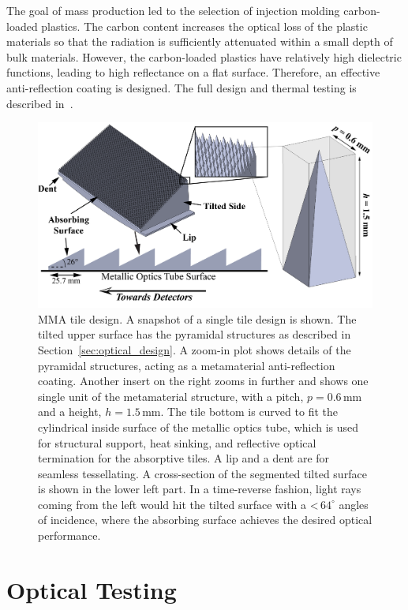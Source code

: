 The goal of mass production led to the selection of injection molding carbon-loaded plastics. The carbon content increases the optical loss of the plastic materials so that the radiation is sufficiently attenuated within a small depth of bulk materials. However, the carbon-loaded plastics have relatively high dielectric functions, leading to high reflectance on a flat surface. Therefore, an effective anti-reflection coating is designed.  The full design and thermal testing is described in~\cite{Xu_2021}.

\begin{figure}[t]
    \centering
    \includegraphics[width = .9\textwidth]{Figures/tile_design.png}
    \caption{MMA tile design. A snapshot of a single tile design is shown. The tilted upper surface has the pyramidal structures as described in Section~\ref{sec:optical_design}. A zoom-in plot shows details of the pyramidal structures, acting as a metamaterial anti-reflection coating. Another insert on the right zooms in further and shows one single unit of the metamaterial structure, with a pitch, $p =0.6\,$mm and a height, $h = 1.5\,$mm. The tile bottom is curved to fit the cylindrical inside surface of the metallic optics tube, which is used for structural support, heat sinking, and reflective optical termination for the absorptive tiles. A lip and a dent are for seamless tessellating. A cross-section of the segmented tilted surface is shown in the lower left part. In a time-reverse fashion, light rays coming from the left would hit the tilted surface with a <\,$64^{\circ}$ angles of incidence, where the absorbing surface achieves the desired optical performance.}
    \label{fig:tile_design}
\end{figure}

\section{Optical Testing}
\label{sec:optical_testing}

